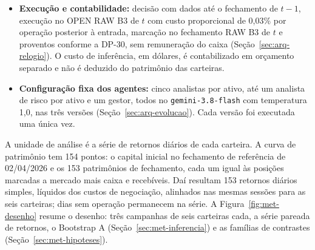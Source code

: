\begin{itemize}
    \item \textbf{Execução e contabilidade:} decisão com dados até o fechamento de $t-1$, execução no OPEN RAW B3 de $t$ com custo proporcional de 0,03\% por operação posterior à entrada, marcação no fechamento RAW B3 de $t$ e proventos conforme a \mbox{DP-30}, sem remuneração do caixa (Seção~\ref{sec:arq-relogio}). O custo de inferência, em dólares, é contabilizado em orçamento separado e não é deduzido do patrimônio das carteiras.
    \item \textbf{Configuração fixa dos agentes:} cinco analistas por ativo, até um analista de risco por ativo e um gestor, todos no \texttt{gemini-3.8-flash} com temperatura 1,0, nas três versões (Seção~\ref{sec:arq-evolucao}). Cada versão foi executada uma única vez.
\end{itemize}

A unidade de análise é a série de retornos diários de cada carteira. A curva de patrimônio tem 154 pontos: o capital inicial no fechamento de referência de 02/04/2026 e os 153 patrimônios de fechamento, cada um igual às posições marcadas a mercado mais caixa e recebíveis. Daí resultam 153 retornos diários simples, líquidos dos custos de negociação, alinhados nas mesmas sessões para as seis carteiras; dias sem operação permanecem na série. A Figura~\ref{fig:met-desenho} resume o desenho: três campanhas de seis carteiras cada, a série pareada de retornos, o Bootstrap A (Seção~\ref{sec:met-inferencia}) e as famílias de contrastes (Seção~\ref{sec:met-hipoteses}).

